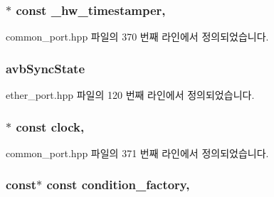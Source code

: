 \subsubsection[{\texorpdfstring{\+\_\+hw\+\_\+timestamper}{_hw_timestamper}}]{$\ast$ const \+\_\+hw\+\_\+timestamper\hspace{0.3cm}{\ttfamily [protected]}, {\ttfamily [inherited]}}\hypertarget{class_common_port_a6b964d49ce26b21cc984b14102973f87}{}\label{class_common_port_a6b964d49ce26b21cc984b14102973f87}


common\+\_\+port.\+hpp 파일의 370 번째 라인에서 정의되었습니다.

\subsubsection[{\texorpdfstring{avb\+Sync\+State}{avbSyncState}}]{ avb\+Sync\+State\hspace{0.3cm}{\ttfamily [private]}}\hypertarget{class_ether_port_acf739edbc2b48c824240d0be5d07d79c}{}\label{class_ether_port_acf739edbc2b48c824240d0be5d07d79c}


ether\+\_\+port.\+hpp 파일의 120 번째 라인에서 정의되었습니다.

\subsubsection[{\texorpdfstring{clock}{clock}}]{$\ast$ const clock\hspace{0.3cm}{\ttfamily [protected]}, {\ttfamily [inherited]}}\hypertarget{class_common_port_aa2bc8731fa5aeb5b033feebc2b67258c}{}\label{class_common_port_aa2bc8731fa5aeb5b033feebc2b67258c}


common\+\_\+port.\+hpp 파일의 371 번째 라인에서 정의되었습니다.

\subsubsection[{\texorpdfstring{condition\+\_\+factory}{condition_factory}}]{ const$\ast$ const condition\+\_\+factory\hspace{0.3cm}{\ttfamily [protected]}, {\ttfamily [inherited]}}\hypertarget{class_common_port_a91ea953f424f90ddff06dc5a6fa00fb1}{}\label{class_common_port_a91ea953f424f90ddff06dc5a6fa00fb1}


